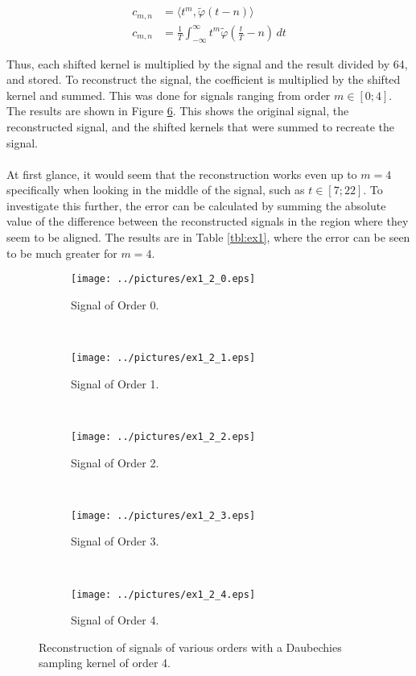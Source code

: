 \documentclass[11pt,a4paper]{report}
\begin{document}
\begin{align}
    c_{m,n} &= \langle t^m, \tilde{\varphi}(t - n)\rangle\label{eq:coefficient}\\
    c_{m,n} &= \frac{1}{T} \int_{-\infty}^{\infty} t^m \tilde{\varphi} \left( \frac{t}{T} -n \right) \,dt \label{eq:constant}
\end{align}

Thus, each shifted kernel is multiplied by the signal and the result divided by 64, and stored. To reconstruct the signal, the coefficient is multiplied by the shifted kernel and summed. This was done for signals ranging from order $m \in [0; 4]$. The results are shown in Figure \ref{fig:ex1_2}. This shows the original signal, the reconstructed signal, and the shifted kernels that were summed to recreate the signal.
\\\\
At first glance, it would seem that the reconstruction works even up to $m=4$ specifically when looking in the middle of the signal, such as $t \in [7; 22]$. To investigate this further, the error can be calculated by summing the absolute value of the difference between the reconstructed signals in the region where they seem to be aligned. The results are in Table \ref{tbl:ex1}, where the error can be seen to be much greater for $m=4$.

\begin{figure}[!ht]
    \captionsetup[subfigure]{position=b}
    \centering
    \begin{subfigure}{0.49\textwidth}
        \texttt{[image: ../pictures/ex1\_2\_0.eps]}
        \caption{Signal of Order 0.}
        \label{fig:ex1_2_0}
    \end{subfigure}
    ~
    \begin{subfigure}{0.49\textwidth}
        \texttt{[image: ../pictures/ex1\_2\_1.eps]}
        \caption{Signal of Order 1.}
        \label{fig:ex1_2_1}
    \end{subfigure}
    \\
    \begin{subfigure}{0.49\textwidth}
        \texttt{[image: ../pictures/ex1\_2\_2.eps]}
        \caption{Signal of Order 2.}
        \label{fig:ex1_2_2}
    \end{subfigure}
    ~
    \begin{subfigure}{0.49\textwidth}
        \texttt{[image: ../pictures/ex1\_2\_3.eps]}
        \caption{Signal of Order 3.}
        \label{fig:ex1_2_3}
    \end{subfigure}
    \\
    \begin{subfigure}{0.75\textwidth}
        \texttt{[image: ../pictures/ex1\_2\_4.eps]}
        \caption{Signal of Order 4.}
        \label{fig:ex1_2_4}
    \end{subfigure}

    \caption{Reconstruction of signals of various orders with a Daubechies sampling kernel of order 4.}
    \label{fig:ex1_2}
\end{figure}
\end{document}
